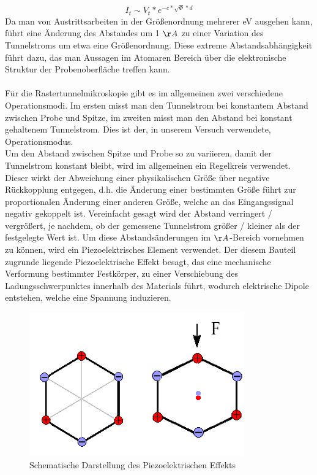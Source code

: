 \documentclass[10pt,a4paper]{article}
\begin{document}
\begin{equation}
I_{t} \sim V_{t} * e^{-c*\sqrt{\Phi }*d}
\end{equation}
Da man von Austrittsarbeiten in der Größenordnung mehrerer eV ausgehen kann, führt eine Änderung des Abstandes um 1 $\AA$ zu einer Variation des Tunnelstroms um etwa eine Größenordnung. Diese extreme Abstandsabhängigkeit führt dazu, das man Aussagen im Atomaren Bereich über die elektronische Struktur der Probenoberfläche treffen kann. \\ \\Für die Rastertunnelmikroskopie gibt es im allgemeinen zwei verschiedene Operationsmodi. Im ersten misst man den Tunnelstrom bei konstantem Abstand zwischen Probe und Spitze, im zweiten misst man den Abstand bei konstant gehaltenem Tunnelstrom. Dies ist der, in unserem Versuch verwendete, Operationsmodus. \\Um den Abstand zwischen Spitze und Probe so zu variieren, damit der Tunnelstrom konstant bleibt, wird im allgemeinen ein Regelkreis verwendet. Dieser wirkt der Abweichung einer physikalischen Größe über negative Rückkopplung entgegen, d.h. die Änderung einer bestimmten Größe führt zur proportionalen Änderung einer anderen Größe, welche an das Eingangssignal negativ gekoppelt ist. Vereinfacht gesagt wird der Abstand verringert / vergrößert, je nachdem, ob der gemessene Tunnelstrom größer / kleiner als der festgelegte Wert ist. Um diese Abstandsänderungen im $\AA$-Bereich vornehmen zu können, wird ein Piezoelektrisches Element verwendet. Der diesem Bauteil zugrunde liegende Piezoelektrische Effekt besagt, das eine mechanische Verformung bestimmter Festkörper, zu einer Verschiebung des Ladungsschwerpunktes innerhalb des Materials führt, wodurch elektrische Dipole entstehen, welche eine Spannung induzieren.
\begin{figure}[h]
	\includegraphics[scale = 1]{1piezo.png}
	\centering
	\caption{Schematische Darstellung des Piezoelektrischen Effekts}
	\label{diagramm_aufspaltung}
\end{figure}
\end{document}
